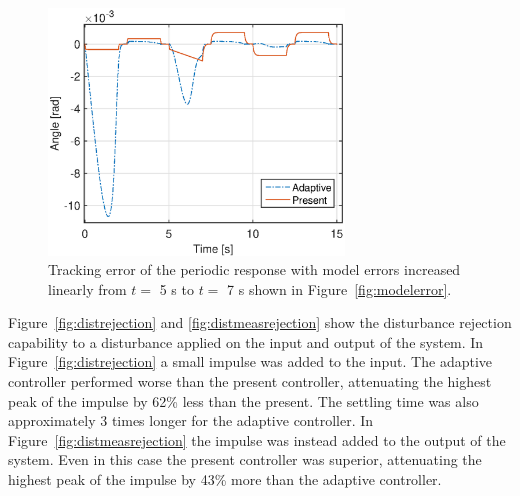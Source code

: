 \begin{figure}[h!]
  \centering
  \includegraphics[width=0.7\textwidth]{fig/matlab/modelerrorperiodic_trackingerror.eps}
  \caption{\label{fig:modelerror_trackingerror} Tracking error of the periodic response with model errors increased linearly from $t=$ 5 s to $t=$ 7 s shown in Figure~\ref{fig:modelerror}.}
\end{figure}

\FloatBarrier
Figure~\ref{fig:distrejection} and \ref{fig:distmeasrejection} show the disturbance rejection capability to a disturbance applied on the input and output of the system. In Figure~\ref{fig:distrejection} a small impulse was added to the input. The adaptive controller performed worse than the present controller, attenuating the highest peak of the impulse by 62\% less than the present. The settling time was also approximately 3 times longer for the adaptive controller. In Figure~\ref{fig:distmeasrejection} the impulse was instead added to the output of the system. Even in this case the present controller was superior, attenuating the highest peak of the impulse by 43\% more than the adaptive controller.

